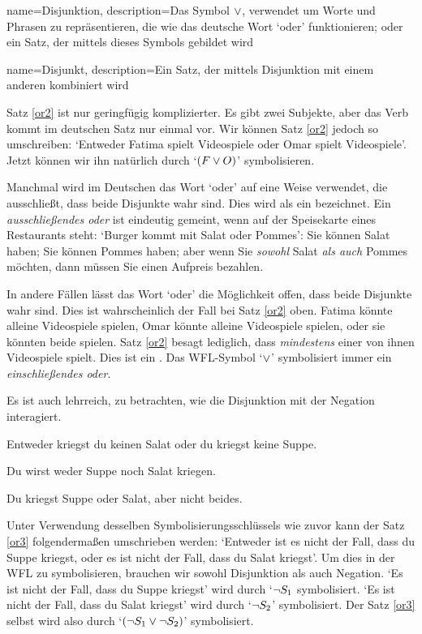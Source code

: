 {
name=Disjunktion,
description={Das Symbol $\vee$, verwendet um Worte und Phrasen zu repräsentieren, die wie das deutsche Wort `oder' funktionieren; oder ein Satz, der mittels dieses Symbols gebildet wird}
}

{
name=Disjunkt,
description={Ein Satz, der mittels \gls{Disjunktion} mit einem anderen kombiniert wird}
}

Satz \ref{or2} ist nur geringfügig komplizierter. Es gibt zwei Subjekte, aber das Verb kommt im deutschen Satz nur einmal vor. Wir können Satz \ref{or2} jedoch so umschreiben: `Entweder Fatima spielt Videospiele  oder Omar spielt Videospiele'. Jetzt können wir ihn natürlich durch `$(F \vee O)$' symbolisieren.

Manchmal wird im Deutschen das Wort `oder' auf eine Weise verwendet, die ausschlie{\ss}t, dass beide Disjunkte wahr sind. Dies wird als ein  bezeichnet. Ein \emph{ausschlie{\ss}endes oder} ist eindeutig gemeint, wenn auf der Speisekarte eines Restaurants steht: `Burger kommt mit Salat oder Pommes': Sie können Salat haben; Sie können Pommes haben; aber wenn Sie \emph{sowohl} Salat \emph{als auch} Pommes möchten, dann müssen Sie einen Aufpreis bezahlen.

In andere Fällen lässt das Wort `oder' die Möglichkeit offen, dass beide Disjunkte wahr sind. Dies ist wahrscheinlich der Fall bei Satz \ref{or2} oben. Fatima könnte alleine Videospiele spielen, Omar könnte alleine Videospiele spielen, oder sie könnten beide spielen. Satz \ref{or2} besagt lediglich, dass \emph{mindestens} einer von ihnen Videospiele spielt. Dies ist ein . Das WFL-Symbol `$\vee$' symbolisiert immer ein \emph{einschlie{\ss}endes oder}.

Es ist auch lehrreich, zu betrachten, wie die Disjunktion mit der Negation interagiert.
	\begin{earg}
		\item[\ex{or3}] Entweder kriegst du keinen Salat oder du kriegst keine Suppe.
		\item[\ex{or4}] Du wirst weder Suppe noch Salat kriegen.
		\item[\ex{or.xor}] Du kriegst Suppe oder Salat, aber nicht beides.
	\end{earg}
Unter Verwendung desselben Symbolisierungsschlüssels wie zuvor kann der Satz \ref{or3} folgenderma{\ss}en umschrieben werden: `Entweder ist es nicht der Fall, dass du Suppe kriegst, oder es ist nicht der Fall, dass du Salat kriegst'. Um dies in der WFL zu symbolisieren, brauchen wir sowohl Disjunktion als auch Negation. `Es ist nicht der Fall, dass du Suppe kriegst' wird durch `$\neg S_1$ symbolisiert. `Es ist nicht der Fall, dass du Salat kriegst' wird durch `$\neg S_2$' symbolisiert. Der Satz \ref{or3} selbst wird also durch `$(\neg S_1 \vee \neg S_2)$' symbolisiert.

